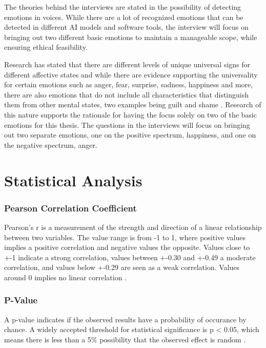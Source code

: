  The theories behind the interviews are stated in the possibility of detecting emotions in voices. While there are a lot of recognized emotions that can be detected in different AI models and software tools, the interview will focus on bringing out two different basic emotions to maintain a manageable scope, while ensuring ethical feasibility.

Research has stated that there are different levels of unique universal signs for different affective states and while there are evidence supporting the universality for certain emotions such as anger, fear, surprise, sadness, happiness and more, there are also emotions that do not include all characteristics that distinguish them from other mental states, two examples being guilt and shame \autocite{Ekman2011}. Research of this nature supports the rationale for having the focus solely on two of the basic emotions for this thesis. The questions in the interviews will focus on bringing out two separate emotions, one on the positive spectrum, happiness, and one on the negative spectrum, anger.



\section{Statistical Analysis}
\label{sec:theo-stat-analyse}

\subsubsection{Pearson Correlation Coefficient}
Pearson's r is a measurement of the strength and direction of a linear relationship between two variables. The value range is from -1 to 1, where positive values implies a positive correlation and negative values the opposite.
Values close to +-1 indicate a strong correlation, values between +-0.30 and +-0.49 a moderate correlation, and values 
below +-0.29 are seen as a weak correlation. Values around 0 implies no linear correlation \autocite{Bruce2017}.

\subsubsection{P-Value}
A p-value indicates if the observed results have a probability of occurance by chance. A widely accepted threshold for statistical significance 
is p < 0.05, which means there is less than a 5\% possibility that the observed effect is random \autocite{Bruce2017}. 

